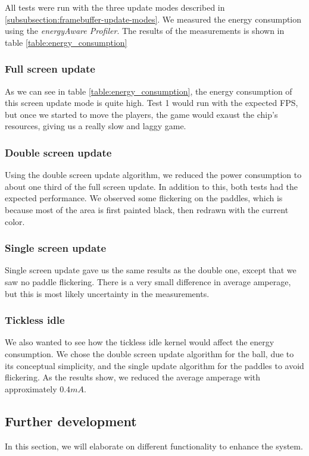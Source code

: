 All tests were run with the three update modes described in \ref{subsubsection:framebuffer-update-modes}. We measured the energy consumption using the \emph{energyAware Profiler}. The results of the measurements is shown in table \ref{table:energy_consumption}



\subsubsection{Full screen update}
As we can see in table \ref{table:energy_consumption}, the energy consumption of this screen update mode is quite high. Test 1 would run with the expected FPS, but once we started to move the players, the game would exaust the chip's resources, giving us a really slow and laggy game.

\subsubsection{Double screen update}
Using the double screen update algorithm, we reduced the power consumption to about one third of the full screen update. In addition to this, both tests had the expected performance. We observed some flickering on the paddles, which is because most of the area is first painted black, then redrawn with the current color.

\subsubsection{Single screen update}
Single screen update gave us the same results as the double one, except that we saw no paddle flickering. There is a very small difference in average amperage, but this is most likely uncertainty in the measurements.

\subsubsection{Tickless idle}
We also wanted to see how the tickless idle kernel would affect the energy consumption. We chose the double screen update algorithm for the ball, due to its conceptual simplicity, and the single update algorithm for the paddles to avoid flickering. As the results show, we reduced the average amperage with approximately $0.4mA$.

\subsection{Further development}
In this section, we will elaborate on different functionality to enhance the system.

